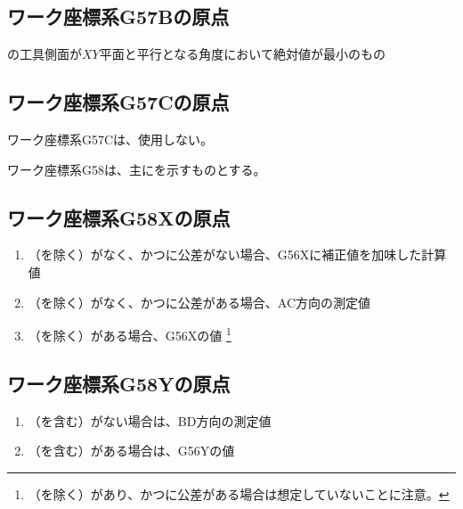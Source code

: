 \subsection{ワーク座標系{\ttfamily G57B}の原点}
\Jig の工具側面が$XY$平面と平行となる角度において絶対値が最小のもの


\subsection{ワーク座標系{\ttfamily G57C}の原点}
ワーク座標系{\ttfamily G57C}は、使用しない。



ワーク座標系{\ttfamily G58}は、主に\KeywayCenter を示すものとする。


\subsection{ワーク座標系{\ttfamily G58X}の原点}
\begin{enumerate}[label*=\sarrow]
\item \TopOutcut（\TopCurvedOutcut を除く）がなく、かつ\AsideKeywayDepth に公差がない場合、{\ttfamily G56X}に補正値を加味した計算値
\item \TopOutcut（\TopCurvedOutcut を除く）がなく、かつ\AsideKeywayDepth に公差がある場合、AC方向\KeywayCenter の測定値
\item \TopOutcut（\TopCurvedOutcut を除く）がある場合、{\ttfamily G56X}の値
\footnote{\TopOutcut（\TopCurvedOutcut を除く）があり、かつ\AsideKeywayDepth に公差がある場合は想定していないことに注意。}
\end{enumerate}


\subsection{ワーク座標系{\ttfamily G58Y}の原点}
\begin{enumerate}[label*=\sarrow]
\item \TopOutcut（\TopCurvedOutcut を含む）がない場合は、BD方向\KeywayCenter の測定値
\item \TopOutcut（\TopCurvedOutcut を含む）がある場合は、{\ttfamily G56Y}の値
\end{enumerate}


